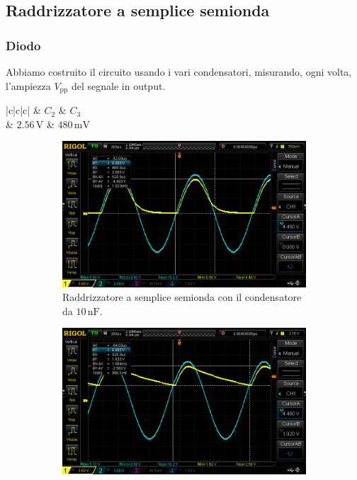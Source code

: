 \documentclass[a4paper]{article}
\begin{document}
{{		\subsection{Raddrizzatore a semplice semionda}
			\subsubsection{Diodo}
				Abbiamo costruito il circuito usando i vari condensatori, misurando, ogni volta, l'ampiezza $ V_{\mathrm{pp}} $ del segnale in output.
				\begin{center}
					\begin{tabular}{ |c|c|c| }
						\hline
						 & \textbf{$ C_{2} $} & \textbf{$ C_{3} $} \\
						\hline
						 & $ 2.56 \, \mathrm{V} $ & $ 480 \, \mathrm{mV} $ \\
						\hline
					\end{tabular}
				\end{center}
				\begin{figure}[h!]
					\centering
					\begin{subfigure}{0.4\textwidth}
						\centering
						\includegraphics[scale=0.2]{raddrizzatoreASempliceSemiondaDiodo10n}
						\caption{Raddrizzatore a semplice semionda con il condensatore da $ 10 \, \mathrm{nF} $.}
					\end{subfigure}
					\begin{subfigure}{0.4\textwidth}
						\centering
						\includegraphics[scale=0.2]{raddrizzatoreASempliceSemiondaDiodo100n}

\end{subfigure}
\end{figure}}}
\end{document}
